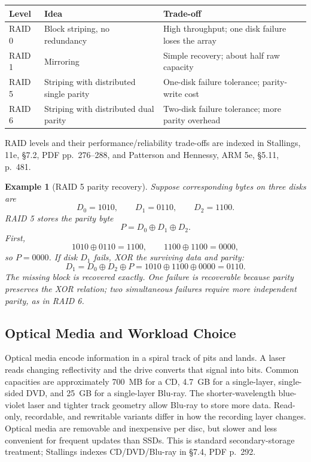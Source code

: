 \documentclass[11pt]{article}
\newtheorem{example}{Example}[section]
\begin{document}
\begin{center}
\footnotesize
\begin{tabular}{@{}>{\raggedright\arraybackslash}p{1.0cm}>{\raggedright\arraybackslash}p{5.0cm}>{\raggedright\arraybackslash}p{5.0cm}@{}}
\toprule
\textbf{Level} & \textbf{Idea} & \textbf{Trade-off} \\
\midrule
RAID 0 & Block striping, no redundancy & High throughput; one disk failure loses the array \\
RAID 1 & Mirroring & Simple recovery; about half raw capacity \\
RAID 5 & Striping with distributed single parity & One-disk failure tolerance; parity-write cost \\
RAID 6 & Striping with distributed dual parity & Two-disk failure tolerance; more parity overhead \\
\bottomrule
\end{tabular}
\end{center}

RAID levels and their performance/reliability trade-offs are indexed in
Stallings, 11e, \S7.2, PDF pp.~276--288, and Patterson and Hennessy, ARM 5e,
\S5.11, p.~481.

\begin{example}[RAID 5 parity recovery]
\label{ex:raid}
Suppose corresponding bytes on three disks are
\[
  D_0=1010,\qquad D_1=0110,\qquad D_2=1100.
\]
RAID 5 stores the parity byte
\[
  P=D_0\oplus D_1\oplus D_2.
\]
First,
\[
  1010\oplus0110=1100,
  \qquad 1100\oplus1100=0000,
\]
so $P=0000$. If disk $D_1$ fails, XOR the surviving data and parity:
\[
  D_1=D_0\oplus D_2\oplus P
     =1010\oplus1100\oplus0000=0110.
\]
The missing block is recovered exactly. One failure is recoverable because
parity preserves the XOR relation; two simultaneous failures require more
independent parity, as in RAID 6.
\end{example}

\subsection{Optical Media and Workload Choice}

Optical media encode information in a spiral track of pits and lands. A laser
reads changing reflectivity and the drive converts that signal into bits.
Common capacities are approximately 700~MB for a CD, 4.7~GB for a
single-layer, single-sided DVD, and 25~GB for a single-layer Blu-ray. The
shorter-wavelength blue-violet laser and tighter track geometry allow Blu-ray
to store more data. Read-only, recordable, and rewritable variants differ in
how the recording layer changes. Optical media are removable and inexpensive
per disc, but slower and less convenient for frequent updates than SSDs. This
is standard secondary-storage treatment; Stallings indexes CD/DVD/Blu-ray in
\S7.4, PDF p.~292.
\end{document}
